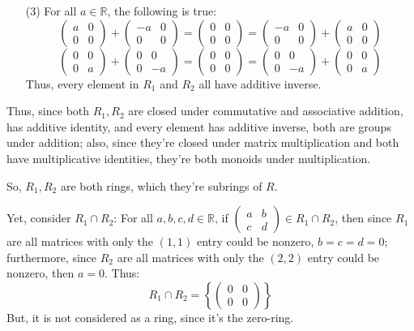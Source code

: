 \documentclass{article}
\begin{document}
\begin{itemize}
    \hfill
    
    \item[(3)] For all $a\in\mathbb{R}$, the following is true:
    $$\begin{pmatrix}
        a&0\\0&0
    \end{pmatrix}+\begin{pmatrix}
        -a&0\\0&0
    \end{pmatrix}=\begin{pmatrix}
        0&0\\0&0
    \end{pmatrix}=\begin{pmatrix}
        -a&0\\0&0
    \end{pmatrix}+\begin{pmatrix}
        a&0\\0&0
    \end{pmatrix}$$
    $$ \begin{pmatrix}
        0&0\\0&a
    \end{pmatrix}+\begin{pmatrix}
        0&0\\0&-a
    \end{pmatrix}=\begin{pmatrix}
        0&0\\0&0
    \end{pmatrix}=\begin{pmatrix}
        0&0\\0&-a
    \end{pmatrix}+\begin{pmatrix}
        0&0\\0&a
    \end{pmatrix}$$
    Thus, every element in $R_1$ and $R_2$ all have additive inverse.
\end{itemize}

Thus, since both $R_1,R_2$ are closed under commutative and associative addition, has additive identity, and every element has additive inverse,
both are groups under addition; also, since they're closed under matrix multiplication and both have multiplicative identities, they're both monoids under multiplication.

So, $R_1,R_2$ are both rings, which they're subrings of $R$.

\hfill

Yet, consider $R_1\cap R_2$: For all $a,b,c,d\in\mathbb{R}$, if $\begin{pmatrix}
    a&b\\c&d
\end{pmatrix} \in R_1\cap R_2$, then since $R_1$ are all matrices with only the $(1,1)$ entry could be nonzero, $b=c=d = 0$;
furthermore, since $R_2$ are all matrices with only the $(2,2)$ entry could be nonzero, then $a=0$. Thus:
$$R_1\cap R_2 = \left\{\begin{pmatrix}
    0&0\\0&0
\end{pmatrix}
\right\}$$
But, it is not considered as a ring, since it's the zero-ring.
\end{document}
